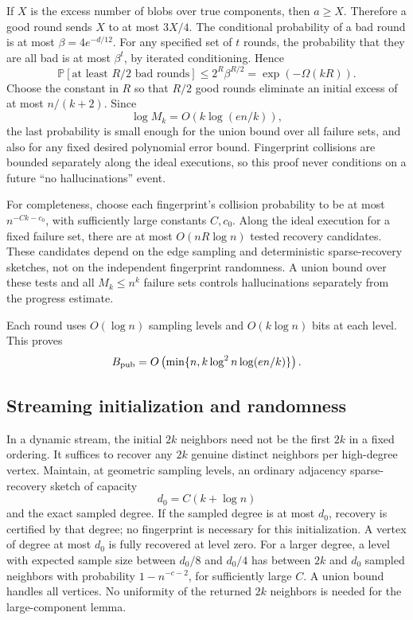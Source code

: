 \documentclass[11pt]{article}
\theoremstyle{remark}\newtheorem{remark}[theorem]{Remark}
\newcommand{\Prb}{\mathbb P}
\begin{document}
If $X$ is the excess number of blobs over true components, then $a\ge X$. Therefore a good round sends $X$ to at most $3X/4$. The conditional probability of a bad round is at most $\beta=4e^{-d/12}$. For any specified set of $t$ rounds, the probability that they are all bad is at most $\beta^t$, by iterated conditioning. Hence
\[
 \Prb[\text{at least }R/2\text{ bad rounds}]
 \le2^R\beta^{R/2}=\exp(-\Omega(kR)).
\]
Choose the constant in $R$ so that $R/2$ good rounds eliminate an initial excess of at most $n/(k+2)$. Since
\[
 \log M_k=O(k\log(en/k)),
\]
the last probability is small enough for the union bound over all failure sets, and also for any fixed desired polynomial error bound. Fingerprint collisions are bounded separately along the ideal executions, so this proof never conditions on a future ``no hallucinations'' event.

For completeness, choose each fingerprint's collision probability to be at most $n^{-Ck-c_0}$, with sufficiently large constants $C,c_0$. Along the ideal execution for a fixed failure set, there are at most $O(nR\log n)$ tested recovery candidates. These candidates depend on the edge sampling and deterministic sparse-recovery sketches, not on the independent fingerprint randomness. A union bound over these tests and all $M_k\le n^k$ failure sets controls hallucinations separately from the progress estimate.

Each round uses $O(\log n)$ sampling levels and $O(k\log n)$ bits at each level. This proves
\[
 B_{\rm pub}=O\left(\min\{n,k\log^2n\log(en/k)\}\right).
\]

\subsection{Streaming initialization and randomness}
In a dynamic stream, the initial $2k$ neighbors need not be the first $2k$ in a fixed ordering. It suffices to recover any $2k$ genuine distinct neighbors per high-degree vertex. Maintain, at geometric sampling levels, an ordinary adjacency sparse-recovery sketch of capacity
\[
 d_0=C(k+\log n)
\]
and the exact sampled degree. If the sampled degree is at most $d_0$, recovery is certified by that degree; no fingerprint is necessary for this initialization. A vertex of degree at most $d_0$ is fully recovered at level zero. For a larger degree, a level with expected sample size between $d_0/8$ and $d_0/4$ has between $2k$ and $d_0$ sampled neighbors with probability $1-n^{-c-2}$, for sufficiently large $C$. A union bound handles all vertices. No uniformity of the returned $2k$ neighbors is needed for the large-component lemma.
\end{document}
